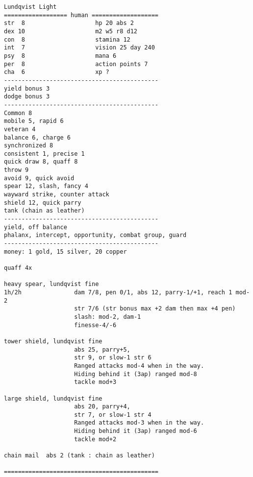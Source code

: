 \goodbreak \small \begin{samepage} \begin{verbatim}
Lundqvist Light
================== human ===================
str  8                    hp 20 abs 2
dex 10                    m2 w5 r8 d12
con  8                    stamina 12
int  7                    vision 25 day 240
psy  8                    mana 6
per  8                    action points 7
cha  6                    xp ?
--------------------------------------------
yield bonus 3
dodge bonus 3
--------------------------------------------
Common 8
mobile 5, rapid 6
veteran 4
balance 6, charge 6
synchronized 8
consistent 1, precise 1
quick draw 8, quaff 8
throw 9
avoid 9, quick avoid
spear 12, slash, fancy 4
wayward strike, counter attack
shield 12, quick parry
tank (chain as leather)
--------------------------------------------
yield, off balance
phalanx, intercept, opportunity, combat group, guard
--------------------------------------------
money: 1 gold, 15 silver, 20 copper

quaff 4x

heavy spear, lundqvist fine
1h/2h               dam 7/8, pen 0/1, abs 12, parry-1/+1, reach 1 mod-2
                    str 7/6 (str bonus max +2 dam then max +4 pen)
                    slash: mod-2, dam-1
                    finesse-4/-6
                    
tower shield, lundqvist fine
                    abs 25, parry+5,
                    str 9, or slow-1 str 6
                    Ranged attacks mod-4 when in the way.
                    Hiding behind it (3ap) ranged mod-8
                    tackle mod+3

large shield, lundqvist fine
                    abs 20, parry+4,
                    str 7, or slow-1 str 4
                    Ranged attacks mod-3 when in the way.
                    Hiding behind it (3ap) ranged mod-6
                    tackle mod+2

chain mail  abs 2 (tank : chain as leather)

============================================
\end{verbatim} \end{samepage} \normalsize

\

